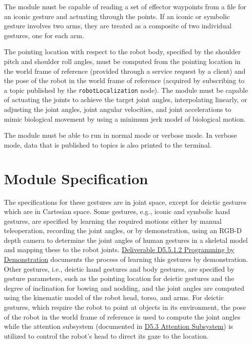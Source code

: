 \documentclass{CSSRforAfrica}
\begin{document}
The module must be capable of reading a set of effector waypoints from a file for an iconic gesture and actuating through the points. If an iconic or symbolic gesture involves two arms, they are treated as a composite of two individual gestures, one for each arm.

The pointing location with respect to the robot body, specified by the shoulder pitch and shoulder roll angles, must be computed from the pointing location in the world frame of reference (provided through a service request by a client) and the pose of the robot in the world frame of reference (acquired by subscribing to a topic published by the \texttt{robotLocalization} node). The module must be capable of actuating the joints to achieve the target joint angles, interpolating linearly, or adjusting the joint angles, joint angular velocities, and joint accelerations to mimic biological movement by using a minimum jerk model of biological motion.

The module must be able to run in normal mode or verbose mode. In verbose mode, data that is published to
topics is also printed to the terminal.


\newpage
\section{Module Specification}

The specifications for these gestures are in joint space, except for deictic gestures which are in
Cartesian space. Some gestures, e.g., iconic and symbolic hand gestures, are specified by learning the required motions either by manual teleoperation, recording the joint angles, or by demonstration, using an RGB-D depth camera to determine the joint angles of human gestures in a skeletal model and mapping these to the robot joints. \href{https://cssr4africa.github.io/deliverables/CSSR4Africa_Deliverable_D5.5.1.2.pdf} {Deliverable D5.5.1.2 Programming by Demonstration} documents the process of learning this gestures by demonstration. Other gestures, i.e., deictic hand gestures and body gestures, are specified by gesture parameters, such as the pointing location for deictic gestures and the degree of inclination for bowing and nodding, and the joint angles are computed using the kinematic model of the robot head, torso, and arms. For deictic gestures, which require the robot to point at objects in its environment, the pose of the robot in the world frame of reference is  used to compute the joint angles while the attention subsystem (documented in \href{https://cssr4africa.github.io/deliverables/CSSR4Africa_Deliverable_D5.3.pdf} {D5.3 Attention Subsystem}) is utilized to control the robot's head to direct its gaze to the location.
\end{document}

